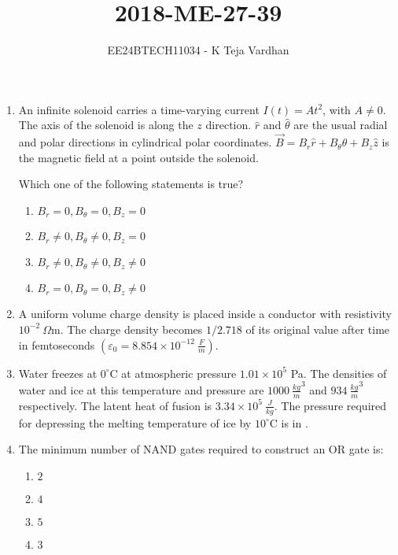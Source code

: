 \documentclass{article}
\newcommand{\brak}[1]{\left( #1 \right)}
\begin{document}

\title{2018-ME-27-39}
\author{EE24BTECH11034 - K Teja Vardhan}
{\let\newpage\relax\maketitle}

\begin{enumerate}

\item An infinite solenoid carries a time-varying current $I\brak{t} = At^2$, with $A \neq 0$. The axis of the solenoid is along the $z$ direction. $\hat{r}$ and $\hat{\theta}$ are the usual radial and polar directions in cylindrical polar coordinates. $\vec{B} = B_r \hat{r} + B_{\theta} \hat{\theta} + B_z \hat{z}$ is the magnetic field at a point outside the solenoid.

Which one of the following statements is true?  

\begin{enumerate}
    \item  $B_r = 0, B_{\theta} = 0, B_z = 0$
    \item  $B_r \neq 0, B_{\theta} \neq 0, B_z = 0$
    \item  $B_r \neq 0, B_{\theta} \neq 0, B_z \neq 0$
    \item  $B_r = 0, B_{\theta} = 0, B_z \neq 0$
\end{enumerate}

\item A uniform volume charge density is placed inside a conductor with resistivity $10^{-2}~\Omega\text{m}$. The charge density becomes $1 / 2.718$ of its original value after time in femtoseconds  $\brak{\varepsilon_0 = 8.854 \times 10^{-12}~\frac{F}{m}}$.

\item Water freezes at $0^\circ$C at atmospheric pressure $1.01 \times 10^5$ Pa. The densities of water and ice at this temperature and pressure are $1000~\frac{kg}{m}^3$ and $934~\frac{kg}{m}^3$ respectively. The latent heat of fusion is $3.34 \times 10^5~\frac{J}{kg}$. The pressure required for depressing the melting temperature of ice by $10^\circ$C is in .

\item The minimum number of NAND gates required to construct an OR gate is:

\begin{enumerate}
    \item $2$
    \item $4$
    \item $5$
    \item $3$
\end{enumerate}


\end{enumerate}
\end{document}

